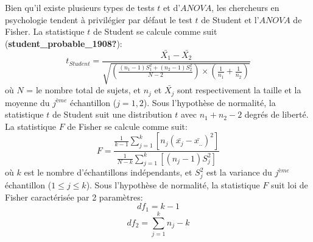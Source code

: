 \documentclass[
  english,
  man]{apa6}
\begin{document}
Bien qu'il existe plusieurs types de tests \(t\) et d'\(ANOVA\), les chercheurs en psychologie tendent à privilégier par défaut le test \(t\) de Student et l'\(ANOVA\) de Fisher. La statistique \(t\) de Student se calcule comme suit (\textbf{student\_probable\_1908?}):
\begin{equation} 
t_{Student}=\frac{\bar{X_1}-\bar{X_2}}{\sqrt{\left(\frac{(n_1-1)S_1^2+(n_2-1)S_2^2}{N-2}\right) \times \left(\frac{1}{n_1}+\frac{1}{n_2}\right)}}
\label{Student}
\end{equation}
où \(N\) = le nombre total de sujets, et \(n_j\) et \(\bar{X_j}\) sont respectivement la taille et la moyenne du \(j^{ème}\) échantillon (\(j = 1, 2\)). Sous l'hypothèse de normalité, la statistique \(t\) de Student suit une distribution \(t\) avec \(n_1+n_2-2\) degrés de liberté. La statistique \(F\) de Fisher se calcule comme suit:\\
\begin{equation} 
F=\frac{\frac{1}{k-1}\sum_{j=1}^k \left[n_j\left(\bar{x_{j}}-\bar{x_{..}}\right)^2 \right]}{\frac{1}{N-k}\sum_{j=1}^k \left[\left(n_j-1\right)S_j^2 \right]}
\label{Fisher}
\end{equation}
où \(k\) est le nombre d'échantillons indépendants, et \(S^2_j\) est la variance du \(j^{ème}\) échantillon (\(1 \le j \le k\)). Sous l'hypothèse de normalité, la statistique \(F\) suit loi de Fisher caractérisée par 2 paramètres:
\begin{equation*} 
df_1 = k-1
\end{equation*}
\begin{equation*} 
df_2 = \sum_{j=1}^k{n_j}-k
\end{equation*}
\end{document}
